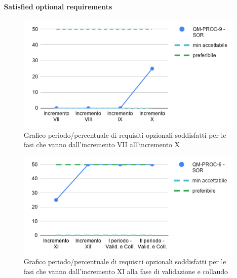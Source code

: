 \paragraph{Satisfied optional requirements}
	\begin{figure}[H]
			\centering
			\includegraphics[width=0.8\linewidth]{./res/images/QM-PROC-9-SOR.png}
			\caption{Grafico periodo/percentuale di requisiti opzionali soddisfatti per le fasi che vanno dall'incremento VII all'incremento X}
			\label{fig:Grafico periodo/percentuale di requisiti opzionali soddisfatti per le fasi che vanno dall'incremento VII all'incremento X}
	\end{figure}
	\begin{figure}[H]
			\centering
			\includegraphics[width=0.8\linewidth]{./res/images/QM-PROC-9-SOR_1.png}
			\caption{Grafico periodo/percentuale di requisiti opzionali soddisfatti per le fasi che vanno dall'incremento XI alla fase di validazione e collaudo}
			\label{fig:Grafico periodo/percentuale di requisiti opzionali soddisfatti per le fasi che vanno dall'incremento XI alla fase di validazione e collaudo}
	\end{figure}


